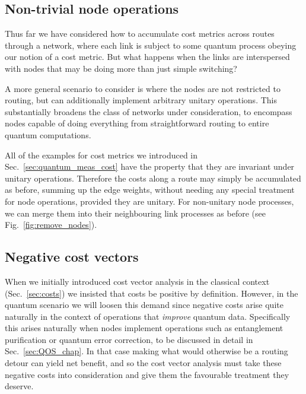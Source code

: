 \subsection{Non-trivial node operations}

Thus far we have considered how to accumulate cost metrics across routes through a network, where each link is subject to some quantum process obeying our notion of a cost metric. But what happens when the links are interspersed with nodes that may be doing more than just simple switching?

A more general scenario to consider is where the nodes are not restricted to routing, but can additionally implement arbitrary unitary operations. This substantially broadens the class of networks under consideration, to encompass nodes capable of doing everything from straightforward routing to entire quantum computations.

All of the examples for cost metrics we introduced in Sec.~\ref{sec:quantum_meas_cost} have the property that they are invariant under unitary operations. Therefore the costs along a route may simply be accumulated as before, summing up the edge weights, without needing any special treatment for node operations, provided they are unitary. For non-unitary node processes, we can merge them into their neighbouring link processes as before (see Fig.~\ref{fig:remove_nodes}).

\subsection{Negative cost vectors}

When we initially introduced cost vector analysis in the classical context (Sec.~\ref{sec:costs}) we insisted that costs be positive by definition. However, in the quantum scenario we will loosen this demand since negative costs arise quite naturally in the context of operations that \textit{improve} quantum data. Specifically this arises naturally when nodes implement operations such as entanglement purification or quantum error correction, to be discussed in detail in Sec.~\ref{sec:QOS_chap}. In that case making what would otherwise be a routing detour can yield net benefit, and so the cost vector analysis must take these negative costs into consideration and give them the favourable treatment they deserve.